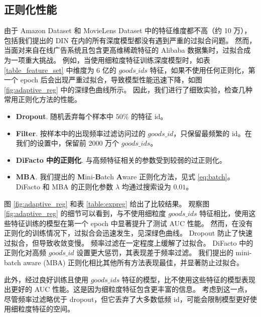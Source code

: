 \subsection{正则化性能}
\label{sec:reg}
由于 Amazon Dataset 和 MovieLens Dataset 中的特征维度都不高（约 10 万），
包括我们提出的 DIN 在内的所有深度模型都没有遇到严重的过拟合问题。
然而，当面对来自在线广告系统且包含更高维稀疏特征的 Alibaba 数据集时，过拟合成为一项重大挑战。
例如，当使用细粒度特征训练深度模型时，如表 \ref{table_feature_set} 中维度为 6 亿的 $goods\_ids$ 特征，如果不使用任何正则化，第一个 epoch 后会出现严重过拟合，导致模型性能迅速下降，如图 \ref{fig:adaptive_reg} 中的深绿色曲线所示。
因此，我们进行了细致实验，检查几种常用正则化方法的性能。
\begin{itemize}
\item \textbf{Dropout\cite{dropout}}. 随机丢弃每个样本中 $50\%$ 的特征 id。
\item \textbf{Filter}. 按样本中的出现频率过滤访问过的 $goods\_id$，只保留最频繁的 id。在我们的设置中，保留前 2000 万个 $goods\_ids$。
\item \textbf{DiFacto\cite{difacto} 中的正则化}. 与高频特征相关的参数受到较弱的过正则化。
\item \textbf{MBA}. 我们提出的 \textbf{M}ini-\textbf{B}atch \textbf{A}ware 正则化方法，见式 \ref{eq:batch}。DiFacto 和 MBA 的正则化参数 $\lambda$ 均通过搜索设为 $0.01$。
\end{itemize}



图 \ref{fig:adaptive_reg} 和表 \ref{table:expreg} 给出了比较结果。
观察图 \ref{fig:adaptive_reg} 的细节可以看到，与不使用细粒度 $goods\_ids$ 特征相比，使用这些特征训练的模型在第一个 epoch 中显著提升了测试 AUC 性能。
然而，在没有正则化的训练情况下，过拟合会迅速发生，见深绿色曲线。
Dropout 防止了快速过拟合，但导致收敛变慢。
频率过滤在一定程度上缓解了过拟合。
DiFacto 中的正则化对高频 $goods\_id$ 设置更大惩罚，其表现差于频率过滤。
我们提出的 mini-batch aware (MBA) 正则化相比其他所有方法表现最佳，并显著防止过拟合。

此外，经过良好训练且使用 $goods\_ids$ 特征的模型，比不使用这些特征的模型表现出更好的 AUC 性能。这是因为细粒度特征包含更丰富的信息。
考虑到这一点，尽管频率过滤略优于 dropout，但它丢弃了大多数低频 id，可能会限制模型更好使用细粒度特征的空间。


